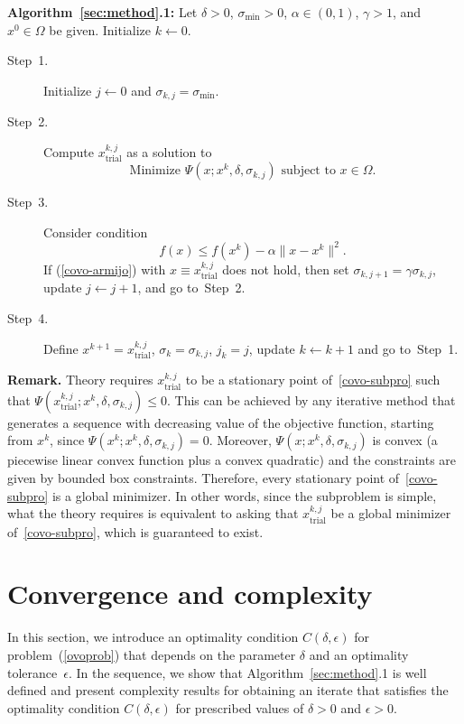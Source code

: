 \documentclass[11pt]{article}
\newcommand{\xkjtrial}{x^{k,j}_{\mathrm{trial}}}
\begin{document}
\noindent
\textbf{Algorithm~\ref{sec:method}.1:} Let $\delta>0$, $\sigma_{\min}>0$,
$\alpha\in(0,1)$, $\gamma>1$, and $x^0 \in \Omega$ be given. Initialize $k\leftarrow 0$.
\begin{description}
\item[Step~1.] Initialize $j\leftarrow 0$ and $\sigma_{k,j} = \sigma_{\min}$.
\item[Step~2.] Compute $\xkjtrial$ as a solution to
    \begin{equation} \label{covo-subpro}
    \mbox{Minimize } \Psi(x;x^k,\delta,\sigma_{k,j}) \mbox{ subject to } x \in \Omega.
    \end{equation} 
\item[Step~3.] Consider condition
    \begin{equation} \label{covo-armijo}
    f(x) \leq f(x^k) - \alpha \|x - x^k\|^2.
    \end{equation}
    If (\ref{covo-armijo}) with $x \equiv \xkjtrial$ does not hold, then set $\sigma_{k,j+1} = \gamma \sigma_{k,j}$, update $j \leftarrow j + 1$,  and go to~Step~2.
\item[Step~4.] Define $x^{k+1} = \xkjtrial$, $\sigma_k = \sigma_{k,j}$, $j_k = j$, update $k \leftarrow k+1$ and go to~Step~1.
\end{description}
  
\noindent
\textbf{Remark.} Theory requires $\xkjtrial$ to be a stationary point of~\eqref{covo-subpro} such that $\Psi(\xkjtrial;x^k,\delta,\sigma_{k,j}) \leq 0$. This can be achieved by any iterative method that generates a sequence with decreasing value of the objective function, starting from $x^k$, since $\Psi(x^k;x^k,\delta,\sigma_{k,j})=0$. Moreover, $\Psi(x;x^k,\delta,\sigma_{k,j})$ is convex (a piecewise linear convex function plus a convex quadratic) and the constraints are given by bounded box constraints. Therefore, every stationary point of~\eqref{covo-subpro} is a global minimizer. In other words, since the subproblem is simple, what the theory requires is equivalent to asking that $\xkjtrial$ be a global minimizer of~\eqref{covo-subpro}, which is guaranteed to exist.

\section{Convergence and complexity} \label{sec:conv}

In this section, we introduce an optimality condition $C(\delta,\epsilon)$ for problem~(\ref{ovoprob}) that depends on the parameter $\delta$ and an optimality tolerance~$\epsilon$. In the sequence, we show that Algorithm~\ref{sec:method}.1 is well defined and present complexity results for obtaining an iterate that satisfies the optimality condition $C(\delta,\epsilon)$ for prescribed values of $\delta > 0$ and $\epsilon > 0$.
\end{document}
